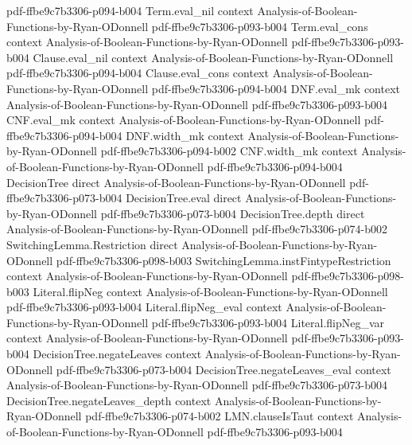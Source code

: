 \begin{lemma}
  {pdf-ffbe9c7b3306-p094-b004}
\proofstep
  {Term.eval_nil}
  {context}
  {Analysis-of-Boolean-Functions-by-Ryan-ODonnell}
  {pdf-ffbe9c7b3306-p093-b004}
\proofstep
  {Term.eval_cons}
  {context}
  {Analysis-of-Boolean-Functions-by-Ryan-ODonnell}
  {pdf-ffbe9c7b3306-p093-b004}
\proofstep
  {Clause.eval_nil}
  {context}
  {Analysis-of-Boolean-Functions-by-Ryan-ODonnell}
  {pdf-ffbe9c7b3306-p094-b004}
\proofstep
  {Clause.eval_cons}
  {context}
  {Analysis-of-Boolean-Functions-by-Ryan-ODonnell}
  {pdf-ffbe9c7b3306-p094-b004}
\proofstep
  {DNF.eval_mk}
  {context}
  {Analysis-of-Boolean-Functions-by-Ryan-ODonnell}
  {pdf-ffbe9c7b3306-p093-b004}
\proofstep
  {CNF.eval_mk}
  {context}
  {Analysis-of-Boolean-Functions-by-Ryan-ODonnell}
  {pdf-ffbe9c7b3306-p094-b004}
\proofstep
  {DNF.width_mk}
  {context}
  {Analysis-of-Boolean-Functions-by-Ryan-ODonnell}
  {pdf-ffbe9c7b3306-p094-b002}
\proofstep
  {CNF.width_mk}
  {context}
  {Analysis-of-Boolean-Functions-by-Ryan-ODonnell}
  {pdf-ffbe9c7b3306-p094-b004}
\proofstep
  {DecisionTree}
  {direct}
  {Analysis-of-Boolean-Functions-by-Ryan-ODonnell}
  {pdf-ffbe9c7b3306-p073-b004}
\proofstep
  {DecisionTree.eval}
  {direct}
  {Analysis-of-Boolean-Functions-by-Ryan-ODonnell}
  {pdf-ffbe9c7b3306-p073-b004}
\proofstep
  {DecisionTree.depth}
  {direct}
  {Analysis-of-Boolean-Functions-by-Ryan-ODonnell}
  {pdf-ffbe9c7b3306-p074-b002}
\proofstep
  {SwitchingLemma.Restriction}
  {direct}
  {Analysis-of-Boolean-Functions-by-Ryan-ODonnell}
  {pdf-ffbe9c7b3306-p098-b003}
\proofstep
  {SwitchingLemma.instFintypeRestriction}
  {context}
  {Analysis-of-Boolean-Functions-by-Ryan-ODonnell}
  {pdf-ffbe9c7b3306-p098-b003}
\proofstep
  {Literal.flipNeg}
  {context}
  {Analysis-of-Boolean-Functions-by-Ryan-ODonnell}
  {pdf-ffbe9c7b3306-p093-b004}
\proofstep
  {Literal.flipNeg_eval}
  {context}
  {Analysis-of-Boolean-Functions-by-Ryan-ODonnell}
  {pdf-ffbe9c7b3306-p093-b004}
\proofstep
  {Literal.flipNeg_var}
  {context}
  {Analysis-of-Boolean-Functions-by-Ryan-ODonnell}
  {pdf-ffbe9c7b3306-p093-b004}
\proofstep
  {DecisionTree.negateLeaves}
  {context}
  {Analysis-of-Boolean-Functions-by-Ryan-ODonnell}
  {pdf-ffbe9c7b3306-p073-b004}
\proofstep
  {DecisionTree.negateLeaves_eval}
  {context}
  {Analysis-of-Boolean-Functions-by-Ryan-ODonnell}
  {pdf-ffbe9c7b3306-p073-b004}
\proofstep
  {DecisionTree.negateLeaves_depth}
  {context}
  {Analysis-of-Boolean-Functions-by-Ryan-ODonnell}
  {pdf-ffbe9c7b3306-p074-b002}
\proofstep
  {LMN.clauseIsTaut}
  {context}
  {Analysis-of-Boolean-Functions-by-Ryan-ODonnell}
  {pdf-ffbe9c7b3306-p093-b004}
\proofstep

\end{lemma}
